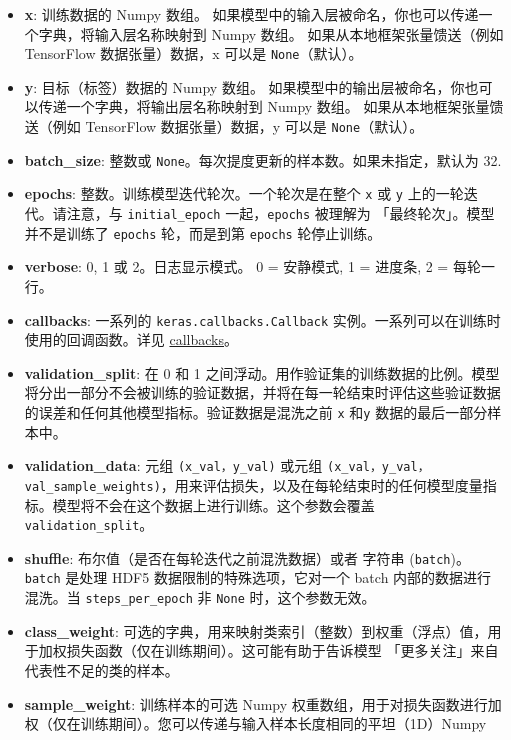 \begin{itemize}
\tightlist
\item
  \textbf{x}: 训练数据的 Numpy 数组。
  如果模型中的输入层被命名，你也可以传递一个字典，将输入层名称映射到
  Numpy 数组。 如果从本地框架张量馈送（例如 TensorFlow 数据张量）数据，x
  可以是 \texttt{None}（默认）。
\item
  \textbf{y}: 目标（标签）数据的 Numpy 数组。
  如果模型中的输出层被命名，你也可以传递一个字典，将输出层名称映射到
  Numpy 数组。 如果从本地框架张量馈送（例如 TensorFlow 数据张量）数据，y
  可以是 \texttt{None}（默认）。
\item
  \textbf{batch\_size}: 整数或
  \texttt{None}。每次提度更新的样本数。如果未指定，默认为 32.
\item
  \textbf{epochs}: 整数。训练模型迭代轮次。一个轮次是在整个 \texttt{x}
  或 \texttt{y} 上的一轮迭代。请注意，与 \texttt{initial\_epoch}
  一起，\texttt{epochs} 被理解为 「最终轮次」。模型并不是训练了
  \texttt{epochs} 轮，而是到第 \texttt{epochs} 轮停止训练。
\item
  \textbf{verbose}: 0, 1 或 2。日志显示模式。 0 = 安静模式, 1 = 进度条,
  2 = 每轮一行。
\item
  \textbf{callbacks}: 一系列的 \texttt{keras.callbacks.Callback}
  实例。一系列可以在训练时使用的回调函数。详见
  \hyperref[callbacks]{callbacks}。
\item
  \textbf{validation\_split}: 在 0 和 1
  之间浮动。用作验证集的训练数据的比例。模型将分出一部分不会被训练的验证数据，并将在每一轮结束时评估这些验证数据的误差和任何其他模型指标。验证数据是混洗之前
  \texttt{x} 和\texttt{y} 数据的最后一部分样本中。
\item
  \textbf{validation\_data}: 元组 \texttt{(x\_val，y\_val)} 或元组
  \texttt{(x\_val，y\_val，val\_sample\_weights)}，用来评估损失，以及在每轮结束时的任何模型度量指标。模型将不会在这个数据上进行训练。这个参数会覆盖
  \texttt{validation\_split}。
\item
  \textbf{shuffle}: 布尔值（是否在每轮迭代之前混洗数据）或者 字符串
  (\texttt{batch})。\texttt{batch} 是处理 HDF5
  数据限制的特殊选项，它对一个 batch 内部的数据进行混洗。当
  \texttt{steps\_per\_epoch} 非 \texttt{None} 时，这个参数无效。
\item
  \textbf{class\_weight}:
  可选的字典，用来映射类索引（整数）到权重（浮点）值，用于加权损失函数（仅在训练期间）。这可能有助于告诉模型
  「更多关注」来自代表性不足的类的样本。
\item
  \textbf{sample\_weight}: 训练样本的可选 Numpy
  权重数组，用于对损失函数进行加权（仅在训练期间）。您可以传递与输入样本长度相同的平坦（1D）Numpy

\end{itemize}
